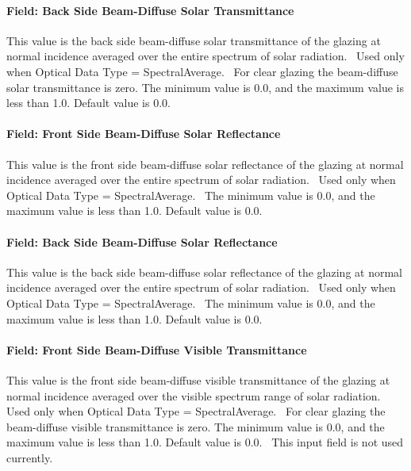 \paragraph{Field: Back Side Beam-Diffuse Solar Transmittance}\label{field-back-side-beam-diffuse-solar-transmittance}

This value is the back side beam-diffuse solar transmittance of the glazing at normal incidence averaged over the entire spectrum of solar radiation.~ Used only when Optical Data Type = SpectralAverage.~ For clear glazing the beam-diffuse solar transmittance is zero. The minimum value is 0.0, and the maximum value is less than 1.0. Default value is 0.0.

\paragraph{Field: Front Side Beam-Diffuse Solar Reflectance}\label{field-front-side-beam-diffuse-solar-reflectance}

This value is the front side beam-diffuse solar reflectance of the glazing at normal incidence averaged over the entire spectrum of solar radiation.~ Used only when Optical Data Type = SpectralAverage.~ The minimum value is 0.0, and the maximum value is less than 1.0. Default value is 0.0.

\paragraph{Field: Back Side Beam-Diffuse Solar Reflectance}\label{field-back-side-beam-diffuse-solar-reflectance}

This value is the back side beam-diffuse solar reflectance of the glazing at normal incidence averaged over the entire spectrum of solar radiation.~ Used only when Optical Data Type = SpectralAverage.~ The minimum value is 0.0, and the maximum value is less than 1.0. Default value is 0.0.

\paragraph{Field: Front Side Beam-Diffuse Visible Transmittance}\label{field-front-side-beam-diffuse-visible-transmittance}

This value is the front side beam-diffuse visible transmittance of the glazing at normal incidence averaged over the visible spectrum range of solar radiation.~ Used only when Optical Data Type = SpectralAverage.~ For clear glazing the beam-diffuse visible transmittance is zero. The minimum value is 0.0, and the maximum value is less than 1.0. Default value is 0.0.~ This input field is not used currently.

